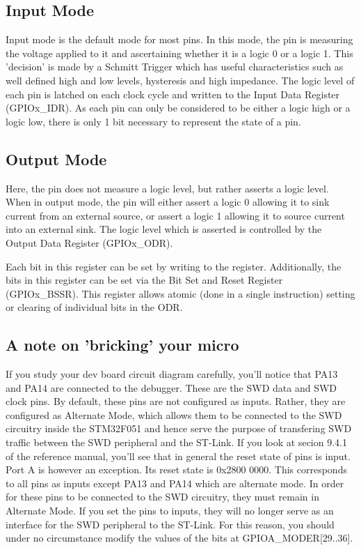 \subsection{Input Mode}
Input mode is the default mode for most pins. In this mode, the pin is measuring the voltage applied to it and ascertaining whether it is a logic 0 or a logic 1. This 'decision' is made by a Schmitt Trigger which has useful characteristics such as well defined high and low levels, hysteresis and high impedance. The logic level of each pin is latched on each clock cycle and written to the Input Data Register (GPIOx\_IDR). As each pin can only be considered to be either a logic high or a logic low, there is only 1 bit necessary to represent the state of a pin.

\subsection{Output Mode}
Here, the pin does not measure a logic level, but rather asserts a logic level. When in output mode, the pin will either assert a logic 0 allowing it to sink current from an external source, or assert a logic 1 allowing it to source current into an external sink. The logic level which is asserted is controlled by the Output Data Register (GPIOx\_ODR). 

Each bit in this register can be set by writing to the register. Additionally, the bits in this register can be set via the Bit Set and Reset Register (GPIOx\_BSSR). This register allows atomic (done in a single instruction) setting or clearing of individual bits in the ODR. 

\subsection{A note on 'bricking' your micro}
If you study your dev board circuit diagram carefully, you'll notice that PA13 and PA14 are connected to the debugger. These are the SWD data and SWD clock pins. By default, these pins are not configured as inputs. Rather, they are configured as Alternate Mode, which allows them to be connected to the SWD circuitry inside the STM32F051 and hence serve the purpose of transfering SWD traffic between the SWD peripheral and the ST-Link. If you look at secion 9.4.1 of the reference manual, you'll see that in general the reset state of pins is input. Port A is however an exception. Its reset state is 0x2800 0000. This corresponds to all pins as inputs except PA13 and PA14 which are alternate mode. In order for these pins to be connected to the SWD circuitry, they must remain in Alternate Mode. If you set the pins to inputs, they will no longer serve as an interface for the SWD peripheral to the ST-Link. For this reason, you should under no circumstance modify the values of the bits at GPIOA\_MODER[29..36]. 

